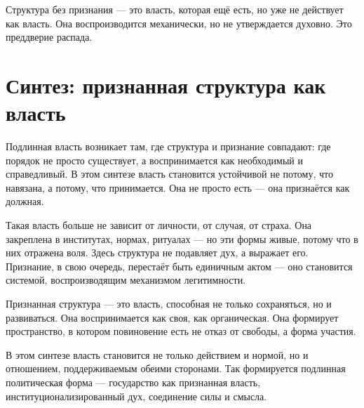 Структура без признания — это власть, которая ещё есть, но уже не действует как власть. Она воспроизводится механически, но не утверждается духовно. Это преддверие распада.

\section{Синтез: признанная структура как власть}

Подлинная власть возникает там, где структура и признание совпадают: где порядок не просто существует, а воспринимается как необходимый и справедливый. В этом синтезе власть становится устойчивой не потому, что навязана, а потому, что принимается. Она не просто есть — она признаётся как должная.

Такая власть больше не зависит от личности, от случая, от страха. Она закреплена в институтах, нормах, ритуалах — но эти формы живые, потому что в них отражена воля. Здесь структура не подавляет дух, а выражает его. Признание, в свою очередь, перестаёт быть единичным актом — оно становится системой, воспроизводящим механизмом легитимности.

Признанная структура — это власть, способная не только сохраняться, но и развиваться. Она воспринимается как своя, как органическая. Она формирует пространство, в котором повиновение есть не отказ от свободы, а форма участия.

В этом синтезе власть становится не только действием и нормой, но и отношением, поддерживаемым обеими сторонами. Так формируется подлинная политическая форма — государство как признанная власть, институционализированный дух, соединение силы и смысла.
